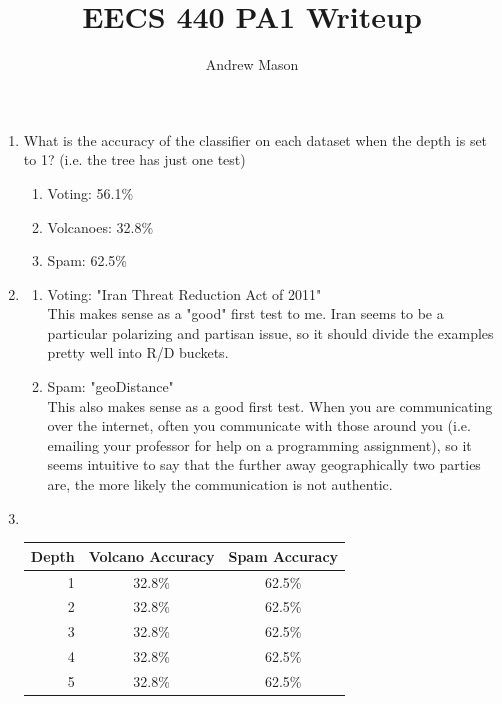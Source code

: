\documentclass[12pt]{article}
\title{EECS 440 PA1 Writeup}
\author{Andrew Mason}
\begin{document}
\maketitle

\begin{enumerate}
  \item What is the accuracy of the classifier on each dataset when the depth
    is set to 1? (i.e. the tree has just one test)
    \begin{enumerate}
      \item Voting: 56.1\%
      \item Volcanoes: 32.8\%
      \item Spam: 62.5\%
    \end{enumerate}
  \item
    \begin{enumerate}
      \item Voting: "Iran Threat Reduction Act of 2011"\\
        This makes sense as a "good" first test to me. Iran seems to be a
        particular polarizing and partisan issue, so it should divide the
        examples pretty well into R/D buckets.
      \item Spam: "geoDistance"\\
        This also makes sense as a good first test. When you are communicating
        over the internet, often you communicate with those around you (i.e.
        emailing your professor for help on a programming assignment), so it
        seems intuitive to say that the further away geographically two parties
        are, the more likely the communication is not authentic.
    \end{enumerate}
  \item ~\\
    \begin{tabular}{|r|c|c|}
      \hline
      Depth & Volcano Accuracy & Spam Accuracy \\ \hline
      1 & 32.8\% & 62.5\% \\ \hline
      2 & 32.8\% & 62.5\% \\ \hline
      3 & 32.8\% & 62.5\% \\ \hline
      4 & 32.8\% & 62.5\% \\ \hline
      5 & 32.8\% & 62.5\% \\ \hline
    \end{tabular}


\end{enumerate}
\end{document}
